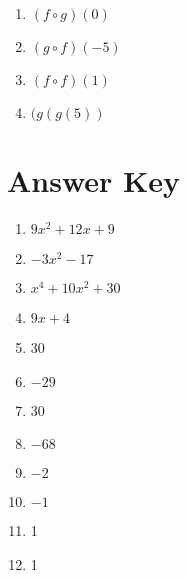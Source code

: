 \begin{multicols}{4}
\begin{enumerate}	\setcounter{enumi}{\value{Review}}
	\item $(f \circ g)(0)$
	\item $(g \circ f)(-5)$
	\item $(f \circ f)(1)$
	\item $(g(g(5))$
\end{enumerate}	\setcounter{Review}{\value{enumi}}
\end{multicols}

\newpage

\section*{Answer Key}

\begin{enumerate}
	\item $9x^2+12x+9$
    \item $-3x^2-17$
    \item $x^4+10x^2+30$
    \item $9x+4$
    \item 30
    \item $-29$
    \item 30
    \item $-68$
    \item $-2$
    \item $-1$
    \item 1
    \item 1
\end{enumerate}